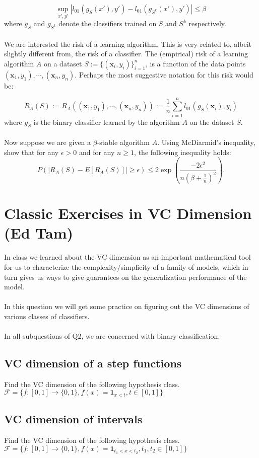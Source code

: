 \documentclass{exam}
\newcommand{\xv}{\boldsymbol{x}}
\begin{document}
$$\sup_{x', y'}  |l_{01}(g_{S}(x'), y') - l_{01}(g_{S^k}(x'), y')| \leq \beta$$
where $g_{S}$ and $g_{S^k}$ denote the classifiers trained on $S$ and $S^k$ respectively. 
\\\\
We are interested the risk of a learning algorithm. This is very related to, albeit slightly different from, the risk of a classifier. The (empirical) risk of a learning algorithm $A$ on a dataset $S := \{(\xv_i, y_i)\}_{i = 1}^n$, is a function of the data points $(\xv_1, y_1), \cdots, (\xv_n, y_n)$. Perhaps the most suggestive notation for this risk would be:

$$R_{A}(S) := R_{A}((\xv_1, y_1), \cdots, (\xv_n, y_n)) := \frac{1}{n}\sum_{i = 1}^n l_{01}(g_{S}(\xv_i), y_i)$$
where $g_{S}$ is the binary classifier learned by the algorithm $A$ on the dataset $S$. 
\\\\Now suppose we are given a $\beta$-stable algorithm $A$. Using McDiarmid's inequality, show that for any $\epsilon > 0$ and for any $n \geq 1$, the following inequality holds: 
$$P(|R_{A}(S) - E[R_{A}(S)]| \geq \epsilon) \leq 2\exp\left(\frac{-2\epsilon^2}{n(\beta + \frac{1}{n})^2}\right).$$

\section{Classic Exercises in VC Dimension (Ed Tam)}
In class we learned about the VC dimension as an important mathematical tool for us to characterize the complexity/simplicity of a family of models, which in turn gives us ways to give guarantees on the generalization performance of the model. 
\\\\
In this question we will get some practice on figuring out the VC dimensions of various classes of classifiers. 
\\\\
In all subquestions of Q2, we are concerned with binary classification. 

\subsection{VC dimension of a step functions}
Find the VC dimension of the following hypothesis class. 
$\mathcal{F} = \{f : [0, 1] \to \{0, 1\}, f(x) = \mathbf{1}_{x<t}, t \in [0, 1]\}$

\subsection{VC dimension of intervals}
Find the VC dimension of the following hypothesis class. 
$\mathcal{F} = \{f : [0, 1] \to \{0, 1\}, f(x) = \mathbf{1}_{t_1< x<t_2}, t_1, t_2 \in [0, 1]\}$
\end{document}
